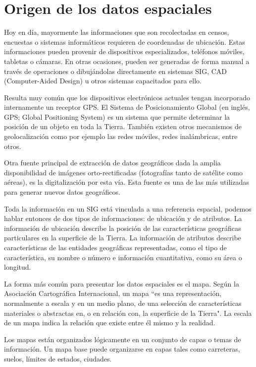 \section{Origen de los datos espaciales}

Hoy en día, mayormente las informaciones que son recolectadas en censos, encuestas o sistemas informáticos requieren de coordenadas de ubicación. Estas informaciones pueden provenir de dispositivos especializados, teléfonos móviles, tabletas o cámaras. En otras ocasiones, pueden ser generadas de forma manual a través de operaciones o dibujándolas directamente en sistemas SIG, CAD (Computer-Aided Design) u otros sistemas capacitados para ello.

Resulta muy común que los dispositivos electrónicos actuales tengan incorporado internamente un receptor GPS. El Sistema de Posicionamiento Global (en inglés, GPS; Global Positioning System) es un sistema que permite determinar la posición de un objeto en toda la Tierra. También existen otros mecanismos de geolocalización como por ejemplo las redes móviles, redes inalámbricas, entre otros.

Otra fuente principal de extracción de datos geográficos dada la amplia disponibilidad de imágenes orto-rectificadas (fotografías tanto de satélite como aéreas), es la digitalización por esta vía. Esta fuente es una de las más utilizadas para generar nuevos datos geográficos.

Toda la información en un SIG está vinculada a una referencia espacial, podemos hablar entonces de dos tipos de informaciones: de ubicación y de atributos. La información de ubicación describe la posición de las características geográficas particulares en la superficie de la Tierra. La información de atributos describe características de las entidades geográficas representadas, como el tipo de característica, su nombre o número e información cuantitativa, como su área o longitud.

La forma más común para presentar los datos espaciales es el mapa. Según la Asociación Cartográfica Internacional, un mapa ``es una representación, normalmente a escala y en un medio plano, de una selección de características materiales o abstractas en, o en relación con, la superficie de la Tierra". La escala de un mapa indica la relación que existe entre él mismo y la realidad.

Los mapas están organizados lógicamente en un conjunto de capas o temas de información. Un mapa base puede organizarse en capas tales como carreteras, suelos, límites de estados, ciudades.

